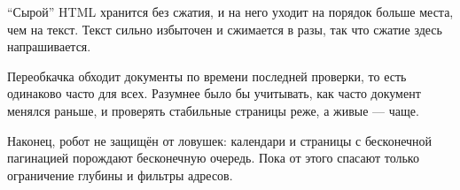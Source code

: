 \enquote{Сырой} HTML хранится без сжатия, и на него уходит на порядок больше
места, чем на текст. Текст сильно избыточен и сжимается в разы, так что сжатие
здесь напрашивается.

Переобкачка обходит документы по времени последней проверки, то есть одинаково
часто для всех. Разумнее было бы учитывать, как часто документ менялся раньше, и
проверять стабильные страницы реже, а живые --- чаще.

Наконец, робот не защищён от ловушек: календари и страницы с бесконечной
пагинацией порождают бесконечную очередь. Пока от этого спасают только
ограничение глубины и фильтры адресов.

\pagebreak
